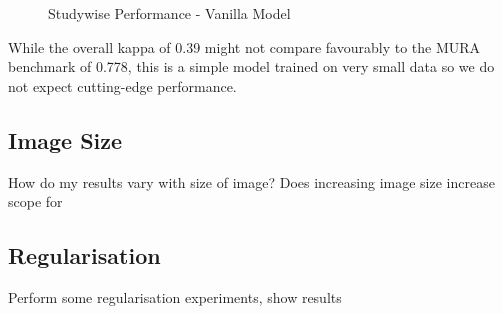 \documentclass[11pt]{article} %
\theoremstyle{plain}
\theoremstyle{definition}
\begin{document}
\begin{figure}[!ht]
\centering
{}
\caption{Studywise Performance - Vanilla Model}
\label{fig:Results_Vanilla_Studywise}
\end{figure}
\FloatBarrier
\noindent
While the overall kappa of 0.39 might not compare favourably to the MURA benchmark of 0.778, this is a simple model trained on very small data so we do not expect cutting-edge performance.

\subsection{Image Size}
How do my results vary with size of image? Does increasing image size increase scope for

\subsection{Regularisation}
Perform some regularisation experiments, show results
\end{document}

